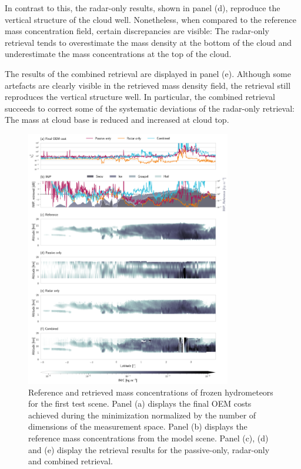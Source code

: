 \documentclass[journal abbreviation, manuscript]{copernicus}
\begin{document}
In contrast to this, the radar-only results, shown in panel (d), reproduce the
vertical structure of the cloud well. Nonetheless, when compared to the
reference mass concentration field, certain discrepancies are visible: The
radar-only retrieval tends to overestimate the mass density at the bottom
of the cloud and underestimate the mass concentrations at the top of the cloud.

The results of the combined retrieval are displayed in panel (e). Although some
artefacts are clearly visible in the retrieved mass density field, the retrieval
still reproduces the vertical structure well. In particular, the combined
retrieval succeeds to correct some of the systematic deviations of the
radar-only retrieval: The mass at cloud base is reduced and increased at cloud
top.


\begin{figure}
\centering
\includegraphics[width = 0.8\textwidth]{../plots/results_a_LargePlateAggregate}
\caption{Reference and retrieved mass concentrations of frozen hydrometeors for
 the first test scene. Panel (a) displays the final OEM costs achieved during
 the minimization normalized by the number of dimensions of the measurement
 space. Panel (b) displays the reference mass concentrations from the model
 scene. Panel (c), (d) and (e) display the retrieval results for the
 passive-only, radar-only and combined retrieval.}
\label{fig:results_a}
\end{figure}
\end{document}
